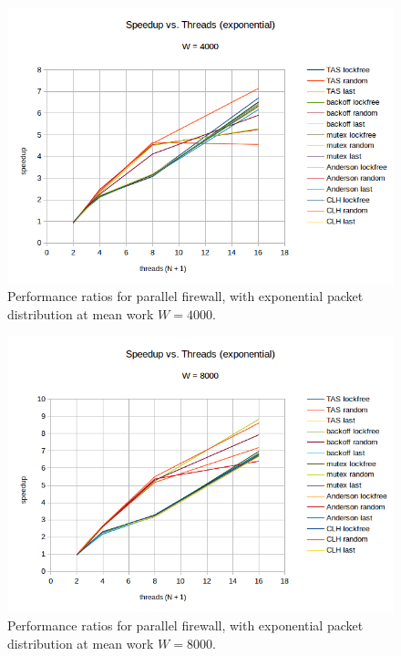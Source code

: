 \documentclass{article}
\begin{document}
\begin{figure}
\begin{center}
	\includegraphics[scale=.8]{packet_3_4000.png}
	\caption{Performance ratios for parallel firewall, with exponential packet distribution at mean work $W = 4000$.}
	\label{packet_3_4000}
\end{center}
\end{figure}

\begin{figure}
\begin{center}
	\includegraphics[scale=.8]{packet_3_8000.png}
	\caption{Performance ratios for parallel firewall, with exponential packet distribution at mean work $W = 8000$.}
	\label{packet_3_8000}
\end{center}
\end{figure}
\end{document}

